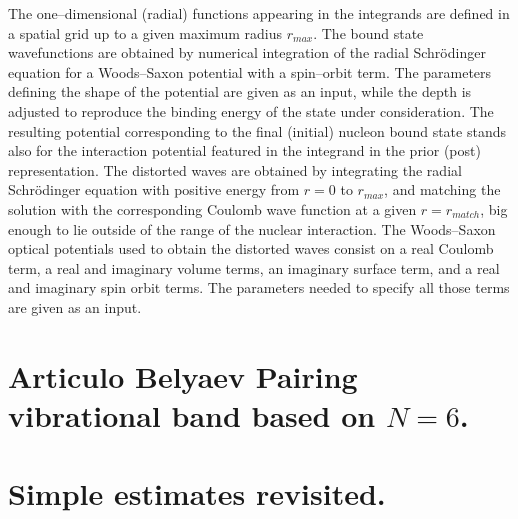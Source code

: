 \begin{subappendices}
The one--dimensional (radial) functions appearing in the integrands are defined in a spatial grid up to a given maximum radius $r_{max}$. The bound state  wavefunctions are obtained by numerical integration of the radial Schr\"odinger equation for a Woods--Saxon potential with a spin--orbit term. The parameters defining the shape of the potential are given as an input, while the depth is adjusted to reproduce the binding energy of the state under consideration. The resulting potential corresponding to the final (initial) nucleon bound state stands also for the interaction potential featured in the integrand in the prior (post) representation. The distorted waves are obtained by integrating the radial Schr\"odinger equation with positive energy from $r=0$ to $r_{max}$, and matching the solution with the corresponding Coulomb wave function at a given $r=r_{match}$, big enough to lie outside of the range of the nuclear interaction. The  Woods--Saxon optical potentials  used to obtain the distorted waves consist on a real Coulomb term, a real and imaginary volume terms, an imaginary surface term, and a real and imaginary spin orbit terms. The parameters needed to specify all those terms are given as an input.  




   
\section{Articulo Belyaev Pairing vibrational band based on $N=6$.}\label{C8AppE}
\section{Simple estimates revisited.}\label{App6F}

\end{subappendices}
